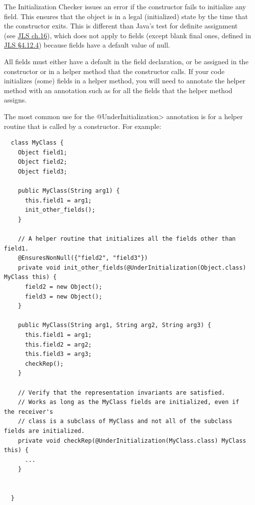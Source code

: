 The Initialization Checker issues an error if the constructor fails to initialize
any  field.  This ensures that the object is in a legal (initialized)
state by the time that the constructor exits.
This is different than Java's test for definite assignment (see
\href{https://docs.oracle.com/javase/specs/jls/se25/html/jls-16.html}{JLS ch.16}),
which does not apply to fields (except blank final ones, defined in
\href{https://docs.oracle.com/javase/specs/jls/se25/html/jls-4.html#jls-4.12.4}{JLS \S 4.12.4}) because fields
have a default value of null.


All  fields must either have a
default in the field declaration, or be assigned in the constructor or in a
helper method that the constructor calls.  If
your code initializes (some) fields in a helper method, you will need to
annotate the helper method with an annotation such as
for all the fields that the helper method assigns.




The most common use for the \<@UnderInitialization> annotation is for a
helper routine that is called by a constructor.  For example:

\begin{Verbatim}
  class MyClass {
    Object field1;
    Object field2;
    Object field3;

    public MyClass(String arg1) {
      this.field1 = arg1;
      init_other_fields();
    }

    // A helper routine that initializes all the fields other than field1.
    @EnsuresNonNull({"field2", "field3"})
    private void init_other_fields(@UnderInitialization(Object.class) MyClass this) {
      field2 = new Object();
      field3 = new Object();
    }

    public MyClass(String arg1, String arg2, String arg3) {
      this.field1 = arg1;
      this.field2 = arg2;
      this.field3 = arg3;
      checkRep();
    }

    // Verify that the representation invariants are satisfied.
    // Works as long as the MyClass fields are initialized, even if the receiver's
    // class is a subclass of MyClass and not all of the subclass fields are initialized.
    private void checkRep(@UnderInitialization(MyClass.class) MyClass this) {
      ...
    }


  }
\end{Verbatim}

